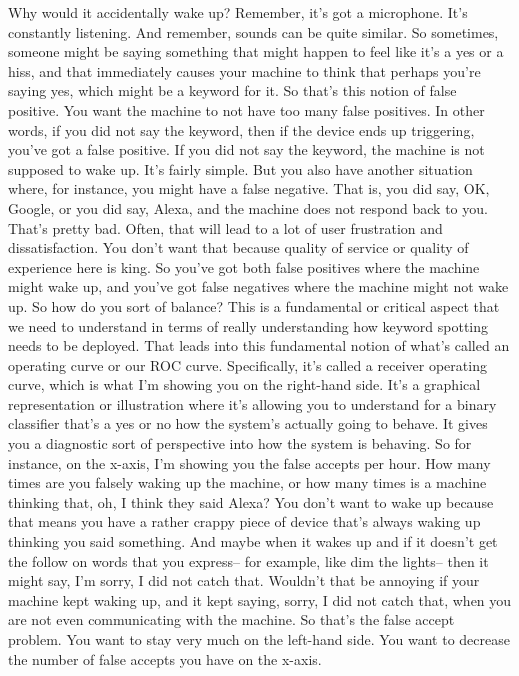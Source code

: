 Why would it accidentally wake up?
Remember, it's got a microphone.
It's constantly listening.
And remember, sounds can be quite similar.
So sometimes, someone might be saying something
that might happen to feel like it's a yes or a hiss,
and that immediately causes your machine to think that perhaps you're saying
yes, which might be a keyword for it.
So that's this notion of false positive.
You want the machine to not have too many false positives.
In other words, if you did not say the keyword,
then if the device ends up triggering, you've got a false positive.
If you did not say the keyword, the machine is not supposed to wake up.
It's fairly simple.
But you also have another situation where, for instance, you
might have a false negative.
That is, you did say, OK, Google, or you did say, Alexa,
and the machine does not respond back to you.
That's pretty bad.
Often, that will lead to a lot of user frustration and dissatisfaction.
You don't want that because quality of service or quality of experience
here is king.
So you've got both false positives where the machine might wake up,
and you've got false negatives where the machine might not wake up.
So how do you sort of balance?
This is a fundamental or critical aspect that we
need to understand in terms of really understanding how
keyword spotting needs to be deployed.
That leads into this fundamental notion of what's called
an operating curve or our ROC curve.
Specifically, it's called a receiver operating
curve, which is what I'm showing you on the right-hand side.
It's a graphical representation or illustration
where it's allowing you to understand for a binary classifier that's
a yes or no how the system's actually going to behave.
It gives you a diagnostic sort of perspective
into how the system is behaving.
So for instance, on the x-axis, I'm showing you the false accepts per hour.
How many times are you falsely waking up the machine,
or how many times is a machine thinking that, oh, I think they said Alexa?
You don't want to wake up because that means
you have a rather crappy piece of device that's always
waking up thinking you said something.
And maybe when it wakes up and if it doesn't get the follow on words
that you express--
for example, like dim the lights--
then it might say, I'm sorry, I did not catch that.
Wouldn't that be annoying if your machine kept waking up,
and it kept saying, sorry, I did not catch that, when you are not even
communicating with the machine.
So that's the false accept problem.
You want to stay very much on the left-hand side.
You want to decrease the number of false accepts you have on the x-axis.
